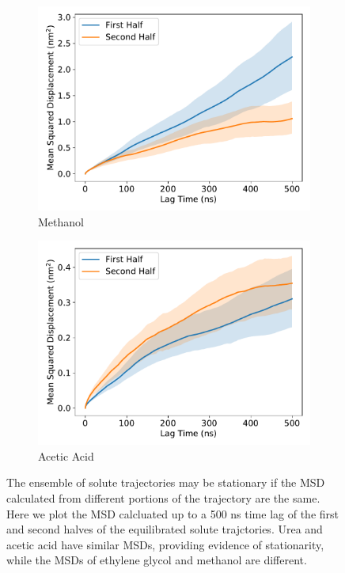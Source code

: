 \documentclass{article}
\begin{document}
\begin{figure}
\begin{subfigure}{0.45\textwidth}
  \includegraphics[width=\textwidth]{MET_MSD_halves.pdf}
  \caption{Methanol}\label{fig:MET_MSD_halves}
  \end{subfigure}
  \begin{subfigure}{0.45\textwidth}
  \includegraphics[width=\textwidth]{ACH_MSD_halves.pdf}
  \caption{Acetic Acid}\label{fig:ACH_MSD_halves}
  \end{subfigure}
  \caption{The ensemble of solute trajectories may be stationary if the MSD
  calculated from different portions of the trajectory are the same. Here we
  plot the MSD calcluated up to a 500 ns time lag of the first and second
  halves of the equilibrated solute trajctories. Urea and acetic acid have
  similar MSDs, providing evidence of stationarity, while the MSDs of 
  ethylene glycol and methanol are different.}\label{fig:msd_comparison}
  \end{figure}
  
\end{document}
